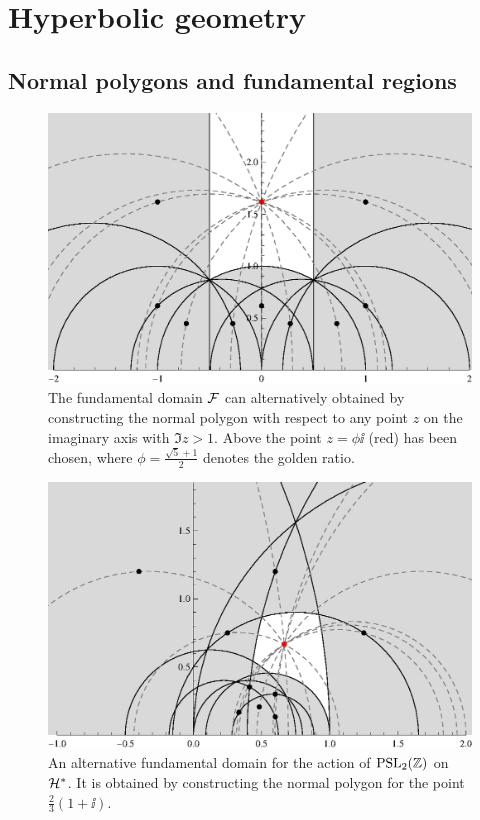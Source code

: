 \section{Hyperbolic geometry}

\subsection{Normal polygons and fundamental regions}


\begin{figure}
\centering
\includegraphics[width=\textwidth]{figures/normpoly-fundom-1}
\caption[The fundamental domain $\FunDom$ as normal polygon]{The fundamental domain $\FunDom$ can alternatively obtained by constructing the normal polygon with respect to any point $z$ on the imaginary axis with $\Im{z} > 1$. Above the point $z = \phi \ii$ (red) has been chosen, where $\phi = \frac{\sqrt{5}+1}{2}$ denotes the golden ratio.}
\label{fig_NormalPolyFunDom}
\end{figure}

\begin{figure}
\centering
\includegraphics[width=\textwidth]{figures/normpoly-fundom-2}
\caption[An alternative fundamental domain for $\PSL{\Z}$]{An alternative fundamental domain for the action of $\PSL{\Z}$ on $\mathcal{H}^\ast$. It is obtained by constructing the normal polygon for the point $\frac{2}{3}(1+\ii)$.}
\label{fig_AltNormalPolyFunDom}
\end{figure}

